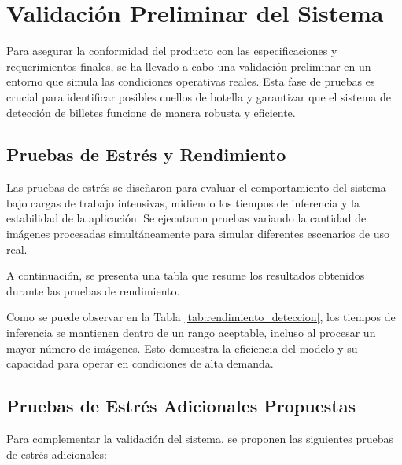 \section{Validación Preliminar del Sistema}

Para asegurar la conformidad del producto con las especificaciones y requerimientos finales, se ha llevado a cabo una validación preliminar en un entorno que simula las condiciones operativas reales. Esta fase de pruebas es crucial para identificar posibles cuellos de botella y garantizar que el sistema de detección de billetes funcione de manera robusta y eficiente.

\subsection{Pruebas de Estrés y Rendimiento}

Las pruebas de estrés se diseñaron para evaluar el comportamiento del sistema bajo cargas de trabajo intensivas, midiendo los tiempos de inferencia y la estabilidad de la aplicación. Se ejecutaron pruebas variando la cantidad de imágenes procesadas simultáneamente para simular diferentes escenarios de uso real.

A continuación, se presenta una tabla que resume los resultados obtenidos durante las pruebas de rendimiento.



Como se puede observar en la Tabla \ref{tab:rendimiento_deteccion}, los tiempos de inferencia se mantienen dentro de un rango aceptable, incluso al procesar un mayor número de imágenes. Esto demuestra la eficiencia del modelo y su capacidad para operar en condiciones de alta demanda.

\subsection{Pruebas de Estrés Adicionales Propuestas}

Para complementar la validación del sistema, se proponen las siguientes pruebas de estrés adicionales:

